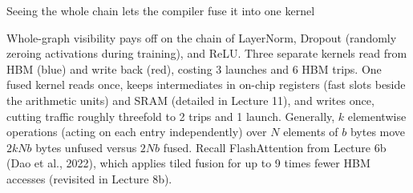 \documentclass[aspectratio=169, 12pt]{beamer}
\begin{document}
\begin{frame}{Seeing the whole chain lets the compiler fuse it into one kernel}
{    Whole-graph visibility pays off on the chain of LayerNorm, Dropout (randomly zeroing activations during training), and ReLU. Three separate kernels read from HBM (blue) and write back (red), costing 3 launches and 6 HBM trips. One fused kernel reads once, keeps intermediates in on-chip registers (fast slots beside the arithmetic units) and SRAM (detailed in Lecture 11), and writes once, cutting traffic roughly threefold to 2 trips and 1 launch. Generally, $k$ elementwise operations (acting on each entry independently) over $N$ elements of $b$ bytes move $2kNb$ bytes unfused versus $2Nb$ fused. Recall FlashAttention from Lecture 6b (Dao et al., 2022), which applies tiled fusion for up to 9 times fewer HBM accesses (revisited in Lecture 8b).



  }
\end{frame}
\end{document}
